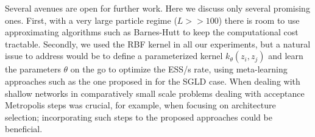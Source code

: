 Several avenues are open for further work. Here we discuss only several promising ones. First, with a very large particle regime ($L >> 100$) there is room to use approximating algorithms such as Barnes-Hutt to keep the computational cost tractable.
Secondly, we used the RBF kernel in all our experiments, but a natural 
issue to address would be to define a parameterized kernel $k_{\theta} (z_i, z_j)$ and learn the parameters $\theta$ on the go to optimize the ESS/s rate, using meta-learning approaches such as the one proposed in \cite{gallego2019vis} for the SGLD case.
When dealing with shallow networks in comparatively small scale problems
\cite{Muller} dealing with acceptance Metropolis steps was crucial, for example,
when focusing on architecture selection; incorporating such steps
to the proposed approaches could be beneficial.




